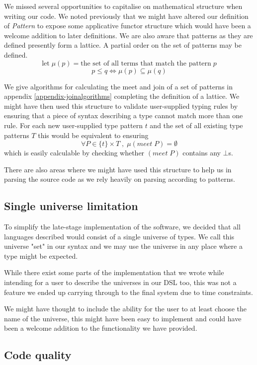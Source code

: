 We missed several opportunities
to capitalise on mathematical structure when writing our
code. We noted previously that we might have altered 
our definition of \emph{Pattern} to expose some applicative functor
structure which would have been a welcome addition to later
definitions. We are also aware that patterns as they are defined
presently form a lattice. A partial order on the set of patterns may
be defined.
$$
\mbox{let} \;μ(p) = \mbox{the set of all terms that match the pattern}\;p
$$
$$
p \leq q \iff \mu (p) \subseteq  \mu (q)
$$

We give algorithms for calculating the meet and join of a set of
patterns in appendix \ref{appendix-joinalgorithms} completing the
definition of a lattice. We might have then used this structure to
validate user-supplied typing rules by ensuring that a piece of syntax
describing a type cannot match more than one rule. For each new
user-supplied type pattern $t$ and the set of all existing type patterns $T$
this would be equivalent to ensuring
$$
\forall P \in \{t\} × T \;,\; \mu (meet \; P) = \emptyset
$$
which is easily calculable by checking whether $(meet \; P)$ contains
any $\bot$s.

There are also areas where we might have used this structure to help
us in parsing the source code as we rely heavily on parsing according
to patterns.

\subsection{Single universe limitation}

To simplify the late-stage implementation of the
software, we decided that all languages described would consist of a
single universe of types. We call this universe "set" in our syntax
and we may use the universe in any place where a type might be
expected.

While there exist some parts of the implementation that we wrote
while intending for a user to describe the universes in our DSL too,
this was not a feature we ended up carrying through to the final
system due to time constraints.

We might have thought to include the ability for the user to at least
choose the name of the universe, this might have been easy to
implement and could have been a welcome addition to the functionality
we have provided.

\subsection{Code quality}

